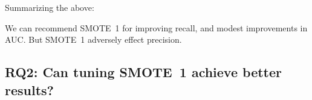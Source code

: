 





\noindent
Summarizing the above:
\begin{lesson1}
We can recommend SMOTE~1 for improving recall, and modest improvements in AUC. But  SMOTE~1 adversely effect
precision.
\end{lesson1}

\subsection{\textbf{RQ2: Can tuning SMOTE~1 achieve better results?}}

